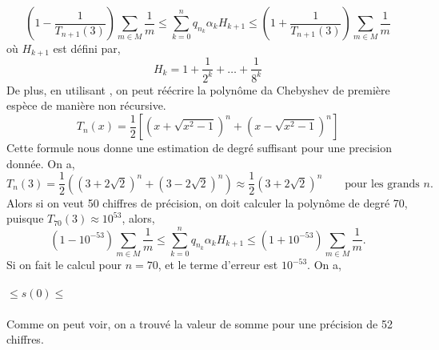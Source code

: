 \begin{equation}
	\left( 1-\frac{1}{T_{n+1}(3)} \right)\sum_{m\in M}\frac{1}{m} \le
	\sum_{k=0}^{n}q_{n_{k}}\alpha_{k}H_{k+1} \le \left(
	1+\frac{1}{T_{n+1}(3)}\right)\sum_{m\in M}\frac{1}{m} 
\end{equation}
o\`u $H_{k+1}$ est d\'efini par,
\[
	H_{k} = 1 + \frac{1}{2^{k}} + \ldots + \frac{1}{8^{k}}
\]
De plus, en utilisant \cite[1.49]{chebyshev}, on peut r\'e\'ecrire la
polyn\^{o}me da Chebyshev de premi\`ere esp\`ece de mani\`ere non r\'ecursive. 
\[
	T_n(x) = \frac{1}{2} \left[ (x+\sqrt{x^2-1})^n + (x-\sqrt{x^2-1})^n \right]
\]
Cette formule nous donne une estimation de degr\'e suffisant pour une
precision donn\'ee. On a,
\[
	T_{n}(3) = \frac{1}{2} ((3+2\sqrt{2})^{n} + (3-2\sqrt{2})^{n}) \approx
	\frac{1}{2}(3+2\sqrt{2})^{n} \qquad \text{pour les grands } n.
\]
Alors si on veut 50 chiffres de pr\'ecision, on doit calculer la polyn\^{o}me de
degr\'e 70, puisque $T_{70}(3) \approx 10^{53}$, alors,
\[
	(1 - 10^{-53})\sum_{m\in M}\frac{1}{m} \le \sum_{k=0}^{n}q_{n_{k}}
	\alpha_{k}H_{k+1} \le (1 + 10^{-53})\sum_{m\in M}\frac{1}{m}.
\]
Si on fait le calcul pour $n = 70$, et le terme d'erreur est $10^{-53}$. On a,\\
 \\
$\le s(0) \le$\\
\\
Comme on peut voir, on a trouv\'e la valeur de somme pour une pr\'ecision de 52
chiffres.
